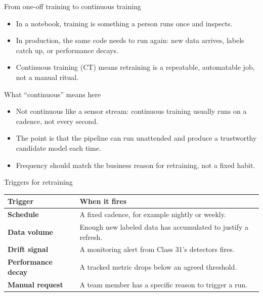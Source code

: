 \begin{frame}{From one-off training to continuous training}
\begin{itemize}
\item In a notebook, training is something a person runs once and inspects.
\item In production, the same code needs to run again: new data arrives, labels catch up, or performance decays.
\item Continuous training (CT) means retraining is a repeatable, automatable job, not a manual ritual.
\end{itemize}
\coursefooter
\end{frame}

\begin{frame}{What ``continuous'' means here}
\begin{itemize}
\item Not continuous like a sensor stream: continuous training usually runs on a cadence, not every second.
\item The point is that the pipeline can run unattended and produce a trustworthy candidate model each time.
\item Frequency should match the business reason for retraining, not a fixed habit.
\end{itemize}
\coursefooter
\end{frame}

\begin{frame}{Triggers for retraining}
\begin{tabularx}{\textwidth}{>{\bfseries}l X}
Trigger & When it fires \\
\toprule
Schedule & A fixed cadence, for example nightly or weekly. \\
Data volume & Enough new labeled data has accumulated to justify a refresh. \\
Drift signal & A monitoring alert from Class 31's detectors fires. \\
Performance decay & A tracked metric drops below an agreed threshold. \\
Manual request & A team member has a specific reason to trigger a run. \\
\bottomrule
\end{tabularx}
\coursefooter
\end{frame}

